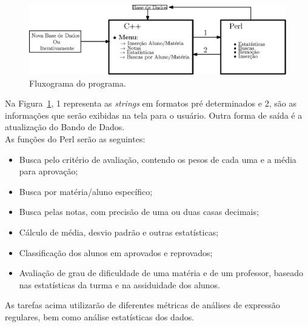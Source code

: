 \documentclass[12pt,a4paper]{article}
\begin{document}
\begin{figure}[!h]
\centering
\includegraphics[width=1\linewidth]{figs/programa}
\caption{Fluxograma do programa.}
\label{fluxo}
\end{figure}
\vspace*{-0.2cm}
Na Figura~\ref{fluxo}, 1 representa as \textit{strings} em formatos pré determinados e 2, são as informações que serão exibidas na tela para o usuário. Outra forma de saída é a atualização do Bando de Dados.
\\
\vspace*{-0.1cm}
As funções do Perl serão as seguintes:
\begin{itemize}
	
	\item Busca pelo critério de avaliação, contendo os pesos de cada uma e a média para aprovação;
	\vspace*{-0.3cm}
	\item Busca por matéria/aluno específico;
	\vspace*{-0.3cm}
	\item Busca pelas notas, com precisão de uma ou duas casas decimais;
	\vspace*{-0.3cm}
	\item Cálculo de média, desvio padrão e outras estatísticas;
	\vspace*{-0.3cm}
	\item Classificação dos alunos em aprovados e reprovados;
	\vspace*{-0.3cm}
	\item Avaliação de grau de dificuldade de uma matéria e de um professor, baseado nas estatísticas da turma e na assiduidade dos alunos.
\end{itemize}
\vspace*{-0.1cm}
As tarefas acima utilizarão de diferentes métricas de análises de expressão regulares, bem como análise estatísticas dos dados. 
\end{document}
